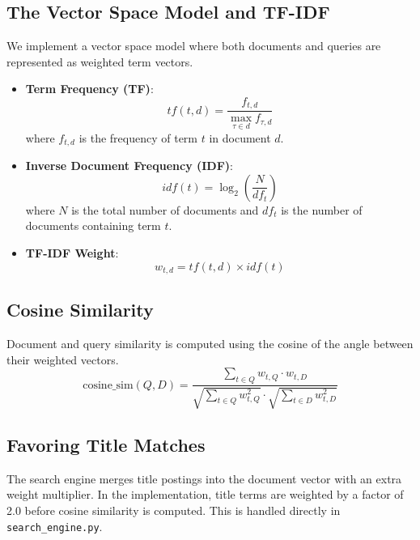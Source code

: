 \documentclass[11pt,a4paper]{article}
\begin{document}
\subsection{The Vector Space Model and TF-IDF}
We implement a vector space model where both documents and queries are represented as weighted term vectors.
\begin{itemize}
    \item \textbf{Term Frequency (TF)}: 
    \begin{equation}
        tf(t,d) = \frac{f_{t,d}}{\max_{\tau \in d} f_{\tau,d}}
    \end{equation}
    where $f_{t,d}$ is the frequency of term $t$ in document $d$.
    
    \item \textbf{Inverse Document Frequency (IDF)}:
    \begin{equation}
        idf(t) = \log_2\left(\frac{N}{df_t}\right)
    \end{equation}
    where $N$ is the total number of documents and $df_t$ is the number of documents containing term $t$.
    
    \item \textbf{TF-IDF Weight}:
    \begin{equation}
        w_{t,d} = tf(t,d) \times idf(t)
    \end{equation}
\end{itemize}

\subsection{Cosine Similarity}
Document and query similarity is computed using the cosine of the angle between their weighted vectors.
\begin{equation}
    \text{cosine\_sim}(Q, D) = \frac{\sum_{t \in Q} w_{t,Q} \cdot w_{t,D}}{\sqrt{\sum_{t \in Q} w_{t,Q}^2} \cdot \sqrt{\sum_{t \in D} w_{t,D}^2}}
\end{equation}

\subsection{Favoring Title Matches}
The search engine merges title postings into the document vector with an extra weight multiplier. In the implementation, title terms are weighted by a factor of 2.0 before cosine similarity is computed. This is handled directly in \texttt{search\_engine.py}.
\end{document}
